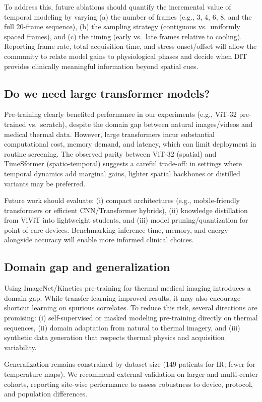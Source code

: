 To address this, future ablations should quantify the incremental
value of temporal modeling by varying (a) the number of frames (e.g.,
3, 4, 6, 8, and the full 20-frame sequence), (b) the sampling strategy
(contiguous vs.\ uniformly spaced frames), and (c) the timing (early
vs.\ late frames relative to cooling). Reporting frame rate, total
acquisition time, and stress onset/offset will allow the community to
relate model gains to physiological phases and decide when DIT
provides clinically meaningful information beyond spatial cues.

\subsection{Do we need large transformer models?}
Pre-training clearly benefited performance in our experiments (e.g.,
ViT-32 pre-trained vs.\ scratch), despite the domain gap between
natural images/videos and medical thermal data. However, large
transformers incur substantial computational cost, memory demand, and
latency, which can limit deployment in routine screening. The observed
parity between ViT-32 (spatial) and TimeSformer (spatio-temporal)
suggests a careful trade-off: in settings where temporal dynamics add
marginal gains, lighter spatial backbones or distilled variants may be
preferred.

Future work should evaluate: (i) compact architectures (e.g.,
mobile-friendly transformers or efficient CNN/Transformer hybrids),
(ii) knowledge distillation from ViViT into lightweight students, and
(iii) model pruning/quantization for point-of-care
devices. Benchmarking inference time, memory, and energy alongside
accuracy will enable more informed clinical choices.

\subsection{Domain gap and generalization}
Using ImageNet/Kinetics pre-training for thermal medical imaging
introduces a domain gap. While transfer learning improved results, it
may also encourage shortcut learning on spurious correlates. To reduce
this risk, several directions are promising: (i) self-supervised or
masked modeling pre-training directly on thermal sequences, (ii)
domain adaptation from natural to thermal imagery, and (iii) synthetic
data generation that respects thermal physics and acquisition
variability.

Generalization remains constrained by dataset size (149 patients for
IR; fewer for temperature maps). We recommend external validation on
larger and multi-center cohorts, reporting site-wise performance to
assess robustness to device, protocol, and population differences.

